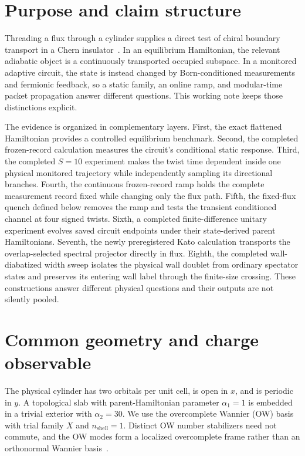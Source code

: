 \documentclass[aps,prb,twocolumn,floatfix,nofootinbib,superscriptaddress]{revtex4-2}
\begin{document}
\maketitle
\setcounter{tocdepth}{2}
\onecolumngrid
\tableofcontents
\twocolumngrid

\section{Purpose and claim structure}

Threading a flux through a cylinder supplies a direct test of chiral boundary
transport in a Chern insulator~\cite{Laughlin1981,Halperin1982}.  In an
equilibrium Hamiltonian, the relevant adiabatic object is a continuously
transported occupied subspace.  In a monitored adaptive circuit, the state is
instead changed by Born-conditioned measurements and fermionic feedback, so a
static family, an online ramp, and modular-time packet propagation answer
different questions.  This working note keeps those distinctions explicit.

The evidence is organized in complementary layers.  First, the exact flattened
Hamiltonian provides a controlled equilibrium benchmark.  Second, the
completed frozen-record calculation measures the circuit's conditional static
response.  Third, the completed $S=10$ experiment makes the twist time
dependent inside one physical monitored trajectory while independently
sampling its directional branches.  Fourth, the continuous frozen-record
ramp holds the complete measurement record fixed while changing only the flux
path.  Fifth, the fixed-flux quench defined below removes the ramp and tests
the transient conditioned channel at four signed twists.  Sixth, a completed
finite-difference unitary experiment evolves saved circuit endpoints under
their state-derived parent Hamiltonians.  Seventh, the newly preregistered
Kato calculation transports the overlap-selected spectral projector directly
in flux.  Eighth, the completed wall-diabatized width sweep isolates the
physical wall doublet from ordinary spectator states and preserves its entering
wall label through the finite-size crossing.  These constructions answer
different physical questions and their outputs are not silently pooled.

\section{Common geometry and charge observable}

The physical cylinder has two orbitals per unit cell, is open in $x$, and is
periodic in $y$.  A topological slab with parent-Hamiltonian parameter
$\alpha_1=1$ is embedded in a trivial exterior with $\alpha_2=30$.  We use the
overcomplete Wannier (OW) basis with trial family $X$ and
$n_{\mathrm{shell}}=1$.  Distinct OW number stabilizers need not commute, and
the OW modes form a localized overcomplete frame rather than an orthonormal
Wannier basis~\cite{BhuiyanPanJian2026}.
\end{document}
